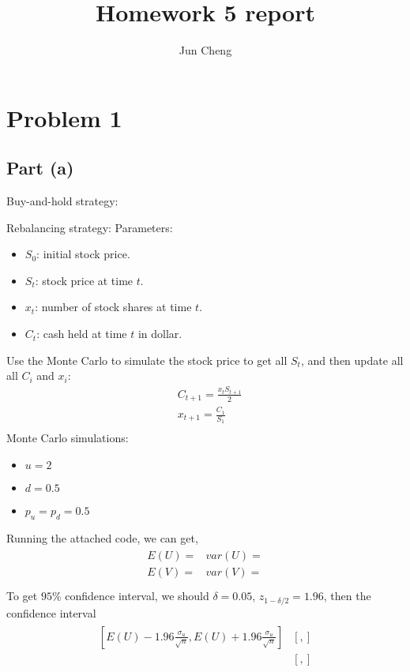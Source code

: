 \documentclass{report}
\begin{document}
\title{Homework 5 report}
\author{Jun Cheng}
\maketitle

\section*{Problem 1} 
\subsection*{Part (a)} 
Buy-and-hold strategy: 

Rebalancing strategy: 
Parameters: 
\begin{itemize}
\item $S_0$: initial stock price.
\item $S_t$: stock price at time $t$.
\item $x_t$: number of stock shares at time $t$.
\item $C_t$: cash held at time $t$ in dollar. 
\end{itemize}
Use the Monte Carlo to simulate the stock price to get all $S_t$,  and then update all all $C_i $ and $x_i$: 
\begin{align*}
&C_{t+1}=\frac{x_tS_{t+1}}{2} \\
&x_{t+1}=\frac{C_1}{S_1}\\
\end{align*}
Monte Carlo simulations: 
\begin{itemize}
\item $ u=2$
\item $ d=0.5$
\item $p_u = p_d = 0.5$
\end{itemize} 
Running the attached code, we can get, 
\begin{align*}\begin{array}{ll}
E(U)=  & var(U) =\\
E(V)=   & var(V)=\\
\end{array} \end{align*}
To get $95\% $ confidence interval, we should $\delta = 0.05$, $z_{1-\delta/2}=1.96$, then the confidence interval  
\begin{align*} \begin{array}{ll}
[E(U)-1.96\frac{\sigma_u}{\sqrt{n}}, E(U)+1.96\frac{\sigma_u}{\sqrt{n}}]  &  [   ,  ]\\
[E(V)-1.96\frac{\sigma_v}{\sqrt{n}},  E(V)+1.96\frac{\sigma_v}{\sqrt{n}}]  &  [   ,  ]\\
\end{array}\end{align*}
\end{document}

